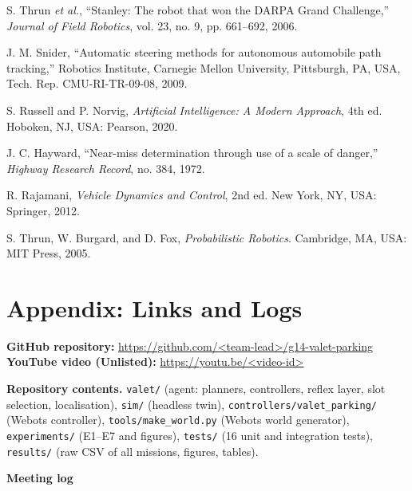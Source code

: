 \documentclass[12pt,a4paper]{article}
\begin{document}
\begin{enumerate}[label={[\arabic*]},leftmargin=*,itemsep=2pt]
\item S. Thrun \textit{et al.}, ``Stanley: The robot that won the DARPA Grand Challenge,'' \textit{Journal of Field Robotics}, vol. 23, no. 9, pp. 661--692, 2006.
\item J. M. Snider, ``Automatic steering methods for autonomous automobile path tracking,'' Robotics Institute, Carnegie Mellon University, Pittsburgh, PA, USA, Tech. Rep. CMU-RI-TR-09-08, 2009.
\item S. Russell and P. Norvig, \textit{Artificial Intelligence: A Modern Approach}, 4th ed. Hoboken, NJ, USA: Pearson, 2020.
\item J. C. Hayward, ``Near-miss determination through use of a scale of danger,'' \textit{Highway Research Record}, no. 384, 1972.
\item R. Rajamani, \textit{Vehicle Dynamics and Control}, 2nd ed. New York, NY, USA: Springer, 2012.
\item S. Thrun, W. Burgard, and D. Fox, \textit{Probabilistic Robotics}. Cambridge, MA, USA: MIT Press, 2005.
\end{enumerate}

\section*{Appendix: Links and Logs}
\textbf{GitHub repository:} \url{https://github.com/<team-lead>/g14-valet-parking} \\
\textbf{YouTube video (Unlisted):} \url{https://youtu.be/<video-id>}

\textbf{Repository contents.} \texttt{valet/} (agent: planners, controllers, reflex layer, slot selection, localisation), \texttt{sim/} (headless twin), \texttt{controllers/valet\_parking/} (Webots controller), \texttt{tools/make\_world.py} (Webots world generator), \texttt{experiments/} (E1--E7 and figures), \texttt{tests/} (16 unit and integration tests), \texttt{results/} (raw CSV of all missions, figures, tables).

\textbf{Meeting log}
\end{document}

